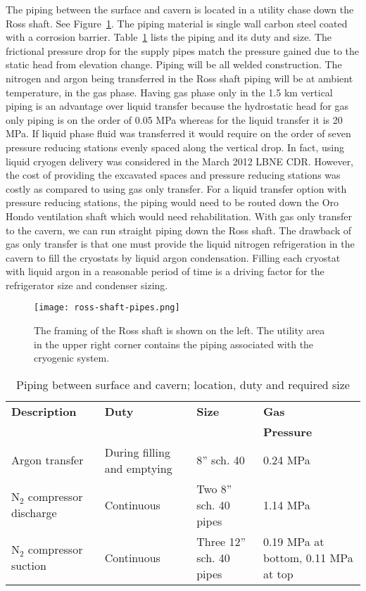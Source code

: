 The piping between the surface and cavern is located in a utility 
chase down the Ross shaft. See Figure~\ref{fig:framing-at-ross-piping}. 
The piping material is single wall carbon steel coated with a corrosion 
barrier. Table~\ref{table:pipelines} lists the piping and its duty 
and size. The frictional pressure drop for the supply pipes match
the pressure gained due to the static head from elevation change. 
Piping will be all welded construction. The nitrogen and argon 
being transferred in the Ross shaft piping will be at ambient 
temperature, in the gas phase. Having gas phase only in the 
1.5 km vertical piping is an advantage over liquid transfer 
because the hydrostatic head for gas only piping is on the order of
0.05 MPa whereas for the liquid transfer it is 20 MPa. If 
liquid phase fluid was transferred it would require on the order of
seven pressure reducing stations evenly spaced along the vertical drop.
In fact, using liquid cryogen delivery was considered in the March 
2012 LBNE CDR. However, the cost of providing 
the excavated spaces and pressure reducing stations was costly 
as compared to using gas only transfer. For a liquid transfer
option with pressure reducing stations, the piping would need 
to be routed down the Oro Hondo ventilation shaft which would 
need rehabilitation. With gas 
only transfer to the cavern, we can run straight piping down 
the Ross shaft. The drawback of gas only transfer is that one 
must provide the liquid nitrogen refrigeration in the cavern 
to fill the cryostats by liquid argon condensation. Filling 
each cryostat with liquid argon in a reasonable period of 
time is a driving factor for the refrigerator size and condenser sizing.

\begin{figure}[htbp]
\centering
\texttt{[image: ross-shaft-pipes.png]} 
\caption{The framing of the Ross shaft is shown on the left. The utility area in the upper
right corner contains the piping
associated with the cryogenic system.}
\label{fig:framing-at-ross-piping}
\end{figure}

\begin{table}
\caption{Piping between surface and cavern; location, duty and required size}
\label{table:pipelines}
\begin{tabular}[htbp]{|p{}|p{}|p{}|p{}|}
\hline
{\bf Description} & {\bf Duty} & {\bf Size} & {\bf Gas} \\
                  &            &            & {\bf Pressure} \\
\hline\hline
Argon transfer & During filling and emptying & 8'' sch. 40 &  0.24 MPa\\
\hline
N$_2$ compressor discharge & Continuous & Two 8'' sch. 40 pipes & 1.14 MPa \\
\hline
N$_2$ compressor suction & Continuous & Three 12'' sch. 40 pipes &  0.19 MPa at bottom, 0.11 MPa at top \\
\hline\end{tabular} 
\end{table}

